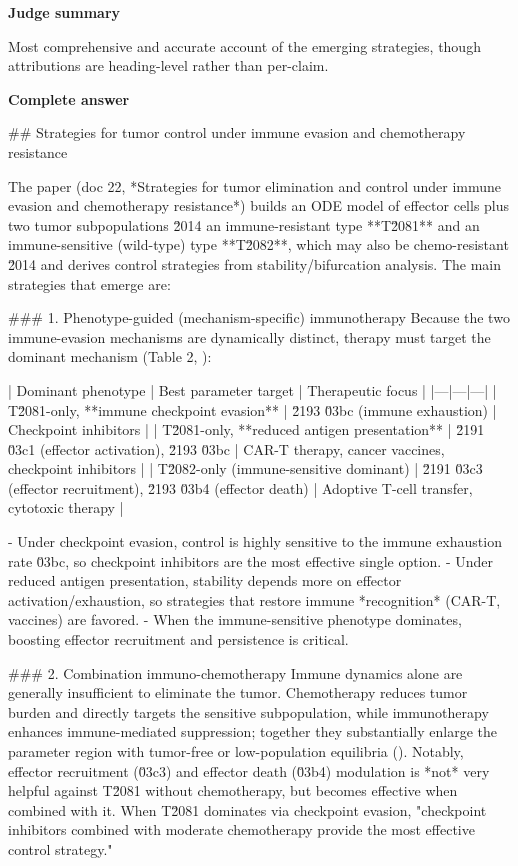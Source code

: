 \documentclass[10pt]{article}
\begin{document}
\textbf{Judge summary}
\begin{EvidenceText}
Most comprehensive and accurate account of the emerging strategies, though attributions are heading-level rather than per-claim.
\end{EvidenceText}

\textbf{Complete answer}
\begin{AnswerText}
## Strategies for tumor control under immune evasion and chemotherapy resistance

The paper (doc 22, *Strategies for tumor elimination and control under immune evasion and chemotherapy resistance*) builds an ODE model of effector cells plus two tumor subpopulations \u2014 an immune-resistant type **T\u2081** and an immune-sensitive (wild-type) type **T\u2082**, which may also be chemo-resistant \u2014 and derives control strategies from stability/bifurcation analysis. The main strategies that emerge are:

### 1. Phenotype-guided (mechanism-specific) immunotherapy
Because the two immune-evasion mechanisms are dynamically distinct, therapy must target the dominant mechanism (Table 2, ):

| Dominant phenotype | Best parameter target | Therapeutic focus |
|---|---|---|
| T\u2081-only, **immune checkpoint evasion** | \u2193 \u03bc (immune exhaustion) | Checkpoint inhibitors |
| T\u2081-only, **reduced antigen presentation** | \u2191 \u03c1 (effector activation), \u2193 \u03bc | CAR-T therapy, cancer vaccines, checkpoint inhibitors |
| T\u2082-only (immune-sensitive dominant) | \u2191 \u03c3 (effector recruitment), \u2193 \u03b4 (effector death) | Adoptive T-cell transfer, cytotoxic therapy |

- Under checkpoint evasion, control is highly sensitive to the immune exhaustion rate \u03bc, so checkpoint inhibitors are the most effective single option.
- Under reduced antigen presentation, stability depends more on effector activation/exhaustion, so strategies that restore immune *recognition* (CAR-T, vaccines) are favored.
- When the immune-sensitive phenotype dominates, boosting effector recruitment and persistence is critical.

### 2. Combination immuno-chemotherapy
Immune dynamics alone are generally insufficient to eliminate the tumor. Chemotherapy reduces tumor burden and directly targets the sensitive subpopulation, while immunotherapy enhances immune-mediated suppression; together they substantially enlarge the parameter region with tumor-free or low-population equilibria (). Notably, effector recruitment (\u03c3) and effector death (\u03b4) modulation is *not* very helpful against T\u2081 without chemotherapy, but becomes effective when combined with it. When T\u2081 dominates via checkpoint evasion, "checkpoint inhibitors combined with moderate chemotherapy provide the most effective control strategy."


\end{AnswerText}
\end{document}

